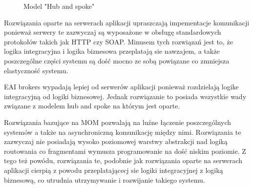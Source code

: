 \setlength\fboxsep{20pt}
\setlength\fboxrule{1pt}
\begin{figure}[!h]
	\centering
	\caption{Model "Hub and spoke"}\label{fig:hub_and_spoke}
\end{figure}

Rozwiązania oparte na serwerach aplikacji upraszczają impementacje komunikacji ponieważ serwery te zazwyczaj są wyposażone w obsługę standardowych protokołów takich jak HTTP czy SOAP. Minusem tych rozwiązań jest to, że logika integracyjna i logika biznesowa przeplatają sie nawzajem, a także poszczególne części systemu są dość mocno ze sobą powiązane co zmniejsza elastyczność systemu.

EAI brokers wypadają lepiej od serwerów aplikacji ponieważ rozdzielają logike integracyjną od logiki biznesowej. Jednak rozwiązanie to posiada wszystkie wady związane z modelem hub and spoke na którym jest oparte.

Rozwiązania bazujące na MOM pozwalają na luźne łączenie poszczególnych systemów a także na asynchroniczną komunikację między nimi. Rozwiązania te zazwyczaj nie posiadają wysoko poziomowej warstwy abstrakcji nad logiką routowania co fragmentami wymusza programowanie na dość niskim poziomie. Z tego też powódu, rozwiązania te, podobnie jak rozwiązania oparte na serwerach aplikacji cierpią z powodu przeplatającecj sie logiki integracyjnej z logiką biznesową, co utrudnia utrzymywanie i rozwijanie takiego systemu.

